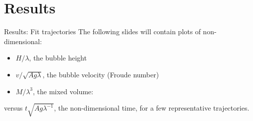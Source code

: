 \documentclass[12pt]{beamer}
\begin{document}
\section{Results}
\begin{frame}[c]{Results: Fit trajectories}
The following slides will contain plots of non-dimensional:
\begin{itemize}
  \item $H / \lambda$, the bubble height 
  \item $v / \sqrt{A g \lambda}$, the bubble velocity (Froude number)
  \item $M / \lambda^3$, the mixed volume: 
\end{itemize}
versus $t \sqrt{A g \lambda^{-1}}$, the  non-dimensional time, for a few representative trajectories.
\end{frame}
\end{document}
